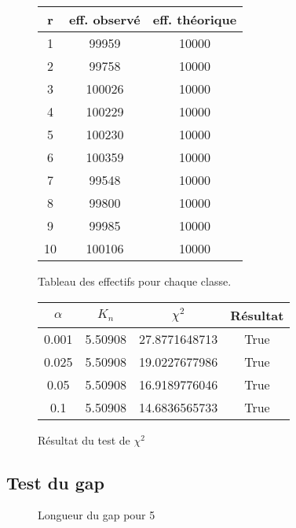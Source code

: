 \documentclass[a4paper,10pt]{article}
\begin{document}
\begin{figure}[h!]
\begin{center}
\begin{tabular}{|c|c|c|}
\hline
r & eff. observé & eff. théorique \\
\hline
1 & 99959 & 10000\\
2 & 99758 & 10000\\
3 & 100026 & 10000\\
4 & 100229 & 10000\\
5 & 100230 & 10000\\
6 & 100359 & 10000\\
7 & 99548 & 10000\\
8 & 99800 & 10000\\
9 & 99985 & 10000\\
10 & 100106 & 10000\\
\hline
\end{tabular}
\end{center}
\caption{Tableau des effectifs pour chaque classe.}
\end{figure}

\begin{figure}[h!]
\begin{center}
\begin{tabular}{|c|c|c|c|}
\hline
$\alpha$ & $K_n$ & $\chi^2$ & Résultat\\
\hline
0.001 & 5.50908 & 27.8771648713 & True\\
0.025 & 5.50908 & 19.0227677986 & True\\
0.05 & 5.50908 & 16.9189776046 & True\\
0.1 & 5.50908 & 14.6836565733 & True\\
\hline
\end{tabular}
\end{center}
\caption{Résultat du test de $\chi^2$}
\end{figure}

\subsection{Test du gap}

\begin{figure}[h!]
\caption{Longueur du gap pour 5}
\label{khi2histo}
\end{figure}
\end{document}
